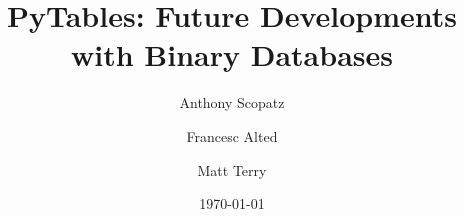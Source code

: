 \documentclass{article}
\begin{document}
\title{PyTables: Future Developments with Binary Databases}
\author{Anthony Scopatz \and 
        Francesc Alted \and
        Matt Terry
        }
\date{\today}

\maketitle










\end{document}
